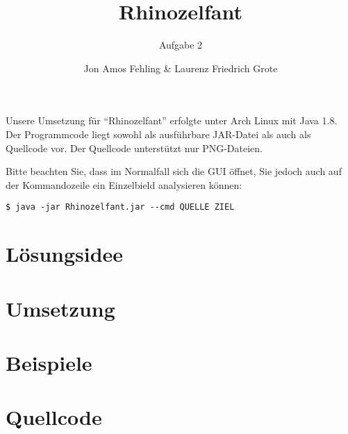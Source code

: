 \documentclass[parskip=full, DIV=14]{scrartcl}
\newcommand{\shellcmd}[1]{\texttt{\$ #1}\\}
\begin{document}
	\pagestyle{scrheadings}


	\titlehead{Aufgabe 2: Rhinozelfant, Team 00001 \hfill Jon Fehling, Laurenz Grote}
	\title{Rhinozelfant}
	\subtitle{Aufgabe 2}
	\author{Jon Amos Fehling \& Laurenz Friedrich Grote}
	\date{}
	\maketitle
	\tableofcontents
	
	\vspace {2em}

	Unsere Umsetzung für "`Rhinozelfant"' erfolgte unter Arch Linux mit Java 1.8. Der Programmcode liegt sowohl als ausführbare JAR-Datei als auch als Quellcode vor. Der Quellcode unterstützt nur PNG-Dateien.

	Bitte beachten Sie, dass im Normalfall sich die GUI öffnet, Sie jedoch auch auf der Kommandozeile ein Einzelbield analysieren können:

	\shellcmd{java -jar Rhinozelfant.jar -{}-cmd QUELLE ZIEL}

	\clearpage
	\section{Lösungsidee}
		
	\clearpage
	\section{Umsetzung}
		
	\clearpage
	\section{Beispiele}
		
	\clearpage
	\section{Quellcode}
		
\end{document}
